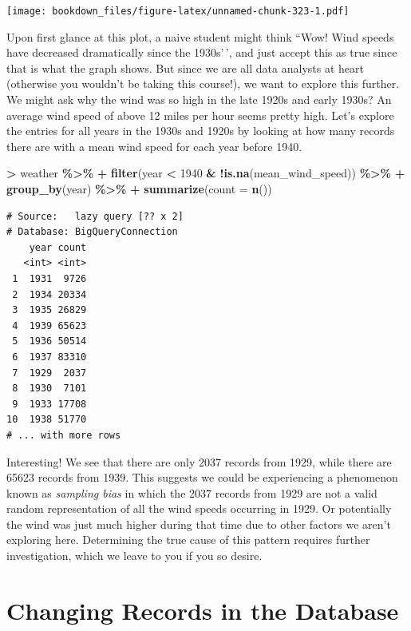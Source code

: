 \documentclass[
]{krantz}
\makeatletter
\newenvironment{Shaded}{\begin{snugshade}}{\end{snugshade}}
\newcommand{\DataTypeTok}[1]{\textcolor[rgb]{0.27,0.27,0.27}{#1}}
\newcommand{\DecValTok}[1]{\textcolor[rgb]{0.06,0.06,0.06}{#1}}
\newcommand{\KeywordTok}[1]{\textcolor[rgb]{0.27,0.27,0.27}{\textbf{#1}}}
\newcommand{\NormalTok}[1]{#1}
\newcommand{\OperatorTok}[1]{\textcolor[rgb]{0.43,0.43,0.43}{\textbf{#1}}}
\newcommand{\StringTok}[1]{\textcolor[rgb]{0.5,0.5,0.5}{#1}}
\newenvironment{kframe}{%
\medskip{}
\setlength{\fboxsep}{.8em}
 \def\at@end@of@kframe{}%
 \ifinner\ifhmode%
  \def\at@end@of@kframe{\end{minipage}}%
  \begin{minipage}{\columnwidth}%
 \fi\fi%
 \def\FrameCommand##1{\hskip\@totalleftmargin \hskip-\fboxsep
 \colorbox{shadecolor}{##1}\hskip-\fboxsep
     \hskip-\linewidth \hskip-\@totalleftmargin \hskip\columnwidth}%
 \MakeFramed {\advance\hsize-\width
   \@totalleftmargin\z@ \linewidth\hsize
   \@setminipage}}%
 {\par\unskip\endMakeFramed%
 \at@end@of@kframe}
\renewenvironment{Shaded}{\begin{kframe}}{\end{kframe}}
\makeatother
\begin{document}
\texttt{[image: bookdown\_files/figure-latex/unnamed-chunk-323-1.pdf]}

Upon first glance at this plot, a naive student might think ``Wow! Wind speeds have decreased dramatically since the 1930s'\,', and just accept this as true since that is what the graph shows. But since we are all data analysts at heart (otherwise you wouldn't be taking this course!), we want to explore this further. We might ask why the wind was so high in the late 1920s and early 1930s? An average wind speed of above 12 miles per hour seems pretty high. Let's explore the entries for all years in the 1930s and 1920s by looking at how many records there are with a mean wind speed for each year before 1940.

\begin{Shaded}
\begin{Highlighting}[]
\OperatorTok{\textgreater{}}\StringTok{ }\NormalTok{weather }\OperatorTok{\%\textgreater{}\%}
\OperatorTok{+}\StringTok{   }\KeywordTok{filter}\NormalTok{(year }\OperatorTok{\textless{}}\StringTok{ }\DecValTok{1940} \OperatorTok{\&}\StringTok{ }\OperatorTok{!}\KeywordTok{is.na}\NormalTok{(mean\_wind\_speed)) }\OperatorTok{\%\textgreater{}\%}
\OperatorTok{+}\StringTok{   }\KeywordTok{group\_by}\NormalTok{(year) }\OperatorTok{\%\textgreater{}\%}
\OperatorTok{+}\StringTok{   }\KeywordTok{summarize}\NormalTok{(}\DataTypeTok{count =} \KeywordTok{n}\NormalTok{())}
\end{Highlighting}
\end{Shaded}

\begin{verbatim}
# Source:   lazy query [?? x 2]
# Database: BigQueryConnection
    year count
   <int> <int>
 1  1931  9726
 2  1934 20334
 3  1935 26829
 4  1939 65623
 5  1936 50514
 6  1937 83310
 7  1929  2037
 8  1930  7101
 9  1933 17708
10  1938 51770
# ... with more rows
\end{verbatim}

Interesting! We see that there are only 2037 records from 1929, while there are 65623 records from 1939. This suggests we could be experiencing a phenomenon known as \emph{sampling bias} in which the 2037 records from 1929 are not a valid random representation of all the wind speeds occurring in 1929. Or potentially the wind was just much higher during that time due to other factors we aren't exploring here. Determining the true cause of this pattern requires further investigation, which we leave to you if you so desire.

\hypertarget{changing-records-in-the-database}{%
\section{Changing Records in the Database}\label{changing-records-in-the-database}}
\end{document}
